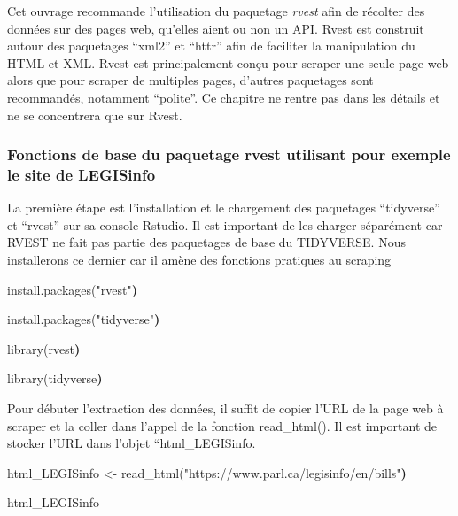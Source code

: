 \documentclass[
  letterpaper,
  DIV=11,
  numbers=noendperiod]{scrreprt}
\newenvironment{Shaded}{\begin{snugshade}}{\end{snugshade}}
\newcommand{\ErrorTok}[1]{\textcolor[rgb]{0.68,0.00,0.00}{#1}}
\newcommand{\ExtensionTok}[1]{\textcolor[rgb]{0.00,0.23,0.31}{#1}}
\newcommand{\KeywordTok}[1]{\textcolor[rgb]{0.00,0.23,0.31}{\textbf{#1}}}
\newcommand{\NormalTok}[1]{\textcolor[rgb]{0.00,0.23,0.31}{#1}}
\newcommand{\OperatorTok}[1]{\textcolor[rgb]{0.37,0.37,0.37}{#1}}
\newcommand{\StringTok}[1]{\textcolor[rgb]{0.13,0.47,0.30}{#1}}
\begin{document}
Cet ouvrage recommande l'utilisation du paquetage \emph{rvest} afin de
récolter des données sur des pages web, qu'elles aient ou non un API.
Rvest est construit autour des paquetages ``xml2'' et ``httr'' afin de
faciliter la manipulation du HTML et XML. Rvest est principalement conçu
pour scraper une seule page web alors que pour scraper de multiples
pages, d'autres paquetages sont recommandés, notamment ``polite''. Ce
chapitre ne rentre pas dans les détails et ne se concentrera que sur
Rvest.

\subsubsection{\texorpdfstring{\textbf{Fonctions de base du paquetage
rvest utilisant pour exemple le site de
LEGISinfo}}{Fonctions de base du paquetage rvest utilisant pour exemple le site de LEGISinfo}}\label{fonctions-de-base-du-paquetage-rvest-utilisant-pour-exemple-le-site-de-legisinfo}

La première étape est l'installation et le chargement des paquetages
``tidyverse'' et ``rvest'' sur sa console Rstudio. Il est important de
les charger séparément car RVEST ne fait pas partie des paquetages de
base du TIDYVERSE. Nous installerons ce dernier car il amène des
fonctions pratiques au scraping

\begin{Shaded}
\begin{Highlighting}[]
\ExtensionTok{install.packages}\ErrorTok{(}\StringTok{"rvest"}\KeywordTok{)}

\ExtensionTok{install.packages}\ErrorTok{(}\StringTok{"tidyverse"}\KeywordTok{)}

\ExtensionTok{library}\ErrorTok{(}\ExtensionTok{rvest}\KeywordTok{)}

\ExtensionTok{library}\ErrorTok{(}\ExtensionTok{tidyverse}\KeywordTok{)}
\end{Highlighting}
\end{Shaded}

Pour débuter l'extraction des données, il suffit de copier l'URL de la
page web à scraper et la coller dans l'appel de la fonction
read\_html(). Il est important de stocker l'URL dans l'objet
``html\_LEGISinfo.

\begin{Shaded}
\begin{Highlighting}[]
\ExtensionTok{html\_LEGISinfo} \OperatorTok{\textless{}}\NormalTok{{-} read\_html}\ErrorTok{(}\StringTok{"https://www.parl.ca/legisinfo/en/bills"}\KeywordTok{)}

\ExtensionTok{html\_LEGISinfo}
\end{Highlighting}
\end{Shaded}
\end{document}
